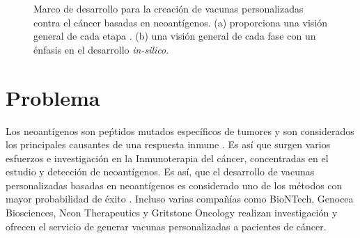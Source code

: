 \begin{figure}[h]
	\centering
	
	\caption{Marco de desarrollo para la creación de vacunas personalizadas contra el cáncer basadas en neoantígenos. (a) proporciona una visión general de cada etapa \citep{han2020progress}. (b) una visión general de cada fase con un énfasis en el desarrollo \textit{in-silico}.}
	\label{fig:vaccines}
\end{figure}

\section{Problema}
\label{sec:problema}

Los neoantígenos son peṕtidos mutados específicos de tumores y son considerados los principales causantes de una respuesta inmune \citep{borden2022cancer, chen2021challenges, gopanenko2020main}. Es así que surgen varios esfuerzos e investigación en la Inmunoterapia del cáncer, concentradas en el estudio y detección de neoantígenos. Es así, que el desarrollo de vacunas personalizadas basadas en neoantígenos es considerado uno de los métodos con mayor probabilidad de éxito \citep{borden2022cancer}. Incluso varias compañías como BioNTech, Genocea Biosciences, Neon Therapeutics y Gritstone Oncology realizan investigación y ofrecen el servicio de generar vacunas personalizadas a pacientes de cáncer.

